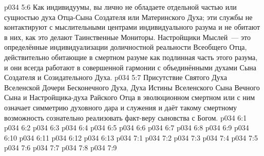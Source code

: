 \vs p034 5:6 \pc Как индивидуумы, вы лично не обладаете отдельной частью или сущностью духа Отца\hyp{}Сына Создателя или Материнского Духа; эти службы не контактируют с мыслительными центрами индивидуального разума и не обитают в них, как это делают Таинственные Мониторы. Настройщики Мыслей~--- это определённые индивидуализации доличностной реальности Всеобщего Отца, действительно обитающие в смертном разуме как подлинная часть этого разума, и они всегда работают в совершенной гармонии с объединёнными духами Сына Создателя и Созидательного Духа.
\vs p034 5:7 Присутствие Святого Духа Вселенской Дочери Бесконечного Духа, Духа Истины Вселенского Сына Вечного Сына и Настройщика\hyp{}духа Райского Отца в эволюционном смертном или с ним означает симметрию духовного дара и служения и даёт такому смертному возможность сознательно реализовать факт\hyp{}веру сыновства с Богом.
\vs p034 6:1 
\vs p034 6:2 
\vs p034 6:3 \pc 
\vs p034 6:4 
\vs p034 6:5 \pc 
\vs p034 6:6 
\vs p034 6:7 
\vs p034 6:8 
\vs p034 6:9 \pc 
\vs p034 6:10 
\vs p034 6:11 \pc 
\vs p034 6:12 
\vs p034 6:13 
\vs p034 7:1 
\vs p034 7:2 
\vs p034 7:3 
\vs p034 7:4 \pc 
\vs p034 7:5 
\vs p034 7:6 \pc 
\vs p034 7:7 
\vs p034 7:8 \pc 
\vsetoff
\vs p034 7:9 
\quizlink

